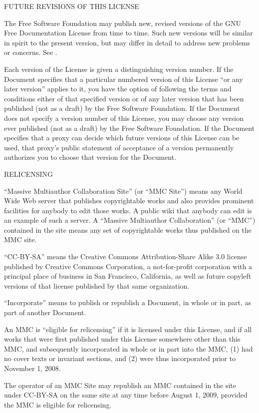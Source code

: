 \item
FUTURE REVISIONS OF THIS LICENSE

The Free Software Foundation may publish new, revised versions of the GNU Free Documentation License from time to time.  Such new versions will be similar in spirit to the present version, but may differ in detail to address new problems or concerns.  See .

Each version of the License is given a distinguishing version number. If the Document specifies that a particular numbered version of this License ``or any later version'' applies to it, you have the option of following the terms and conditions either of that specified version or of any later version that has been published (not as a draft) by the Free Software Foundation.  If the Document does not specify a version number of this License, you may choose any version ever published (not as a draft) by the Free Software Foundation.  If the Document specifies that a proxy can decide which future versions of this License can be used, that proxy's public statement of acceptance of a version permanently authorizes you to choose that version for the Document.

\item
RELICENSING

``Massive Multiauthor Collaboration Site'' (or ``MMC Site'') means any World Wide Web server that publishes copyrightable works and also provides prominent facilities for anybody to edit those works.  A public wiki that anybody can edit is an example of such a server.  A ``Massive Multiauthor Collaboration'' (or ``MMC'') contained in the site means any set of copyrightable works thus published on the MMC site.

``CC-BY-SA'' means the Creative Commons Attribution-Share Alike 3.0 license published by Creative Commons Corporation, a not-for-profit corporation with a principal place of business in San Francisco, California, as well as future copyleft versions of that license published by that same organization.

``Incorporate'' means to publish or republish a Document, in whole or in part, as part of another Document.

An MMC is ``eligible for relicensing'' if it is licensed under this License, and if all works that were first published under this License somewhere other than this MMC, and subsequently incorporated in whole or in part into the MMC, (1) had no cover texts or invariant sections, and (2) were thus incorporated prior to November 1, 2008.

The operator of an MMC Site may republish an MMC contained in the site under CC-BY-SA on the same site at any time before August 1, 2009, provided the MMC is eligible for relicensing.

\stopitemize

